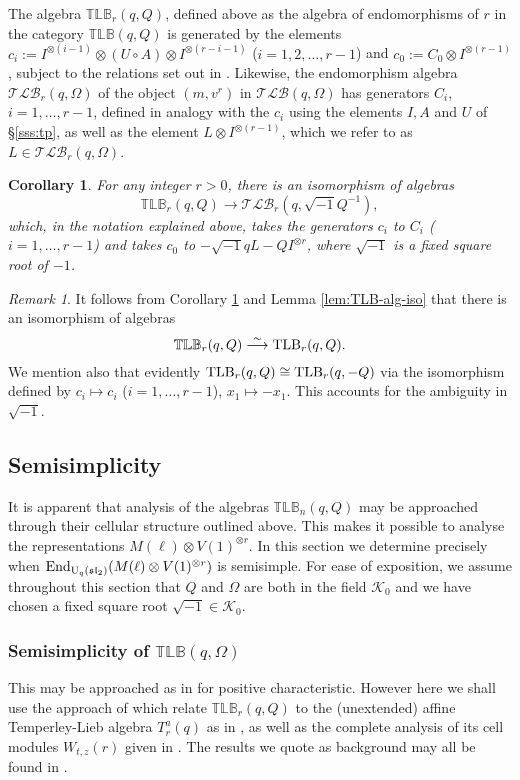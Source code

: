 \documentclass[12pt]{amsart}
\newtheorem{corollary}[theorem]{Corollary}
\theoremstyle{definition}
\theoremstyle{remark}
\newtheorem{remark}[theorem]{Remark}
\numberwithin{equation}{section}
\newcommand{\CK}{{\mathcal K}}
\newcommand{\inv}{^{-1}}
\newcommand{\lr}{\longrightarrow}
\newcommand{\U}{{\rm{U}}}
\newcommand{\End}{{\rm{End}}}
\newcommand{\fsl}{{\mathfrak {sl}}}
\newcommand{\ot}{\otimes}
\newcommand{\TLB}{{\rm{TLB}}}
\newcommand{\TLBB}{{\mathbb{TLB}}}
\newcommand{\TLBC}{\mathcal{TLB}}
\begin{document}
The algebra $\TLBB_r(q,Q)$, defined above as the algebra of endomorphisms of $r$ in the category $\TLBB(q,Q)$
is generated \cite[(5.7)]{GL03} by the elements $c_i:=I^{\ot(i-1)}\ot(U\circ A)\ot I^{\ot(r-i-1)}$ ($i=1,2,\dots,r-1$) and
$c_0:=C_0\ot I^{\ot(r-1)}$, subject to the relations set out in \cite[Prop. (5.3)]{GL03}. Likewise, the endomorphism algebra
$\TLBC_r(q,\Omega)$ of the object $(m,v^r)$ in $\TLBC(q,\Omega)$ has generators $C_i$, $i=1,\dots,r-1$, defined in analogy with
the $c_i$ using the elements $I,A$ and $U$ of \S\ref{sss:tp}, as well as the element $L\ot I^{\ot(r-1)}$, which we refer to as $L\in\TLBC_r(q,\Omega)$.

\begin{corollary}\label{cor:tlb}
For any integer $r>0$, there is an isomorphism of algebras 
$$
\TLBB_r(q,Q)\lr \TLBC_r(q,\sqrt{-1} Q\inv),
$$
which, in the notation explained above, 
takes the generators $c_i$ to $C_i$ ($i=1,\dots,r-1$) and takes $c_0$ to $-\sqrt{-1}qL-Q I^{\ot r}$,
where $\sqrt{-1}$ is a fixed square root of $-1$.
\end{corollary}

\begin{remark}\label{rem:tlb-algs}
It follows from Corollary \ref{cor:tlb} and Lemma \ref{lem:TLB-alg-iso} that there is an isomorphism of algebras 
\[\TLBB_r(q,Q)\overset{\sim}{\lr}\TLB_r(q,Q).
\]
We mention also that evidently $\TLB_r(q,Q)\cong \TLB_r(q,-Q)$ via the isomorphism defined by $c_i\mapsto c_i$
($i=1,\dots,r-1$), $x_1\mapsto -x_1$. This accounts for the ambiguity in $\sqrt{-1}$.
\end{remark}

\subsection{Semisimplicity}
It is apparent that analysis of the algebras $\TLBB_n(q,Q)$ may be approached through their cellular structure 
outlined above.
This makes it possible to analyse the representations $M(\ell)\ot V(1)^{\ot r}$. In this section we 
determine precisely when $\End_{\U_q(\fsl_2)}(M(\ell)\ot V(1)^{\ot r})$ is semisimple. For ease of exposition, we assume 
throughout this section that $Q$ and $\Omega$ are both in the field $\CK_0$ and we have chosen a fixed square root $\sqrt{-1}\in\CK_0$.

\subsubsection{Semisimplicity of $\TLBB(q,\Omega)$} This may be approached as in \cite{CGM} for positive characteristic. 
However here we shall use the approach of \cite{GL98,GL03} which relate $\TLBB_r(q, Q)$ to the (unextended) affine Temperley-Lieb algebra
$T^a_r(q)$ as in \cite{GL03}, as well as the complete analysis of its cell modules $W_{t,z}(r)$ given in \cite{GL98}. 
The results we quote as background may all be found in \cite[\S\S6,10]{GL03}.
\end{document}
